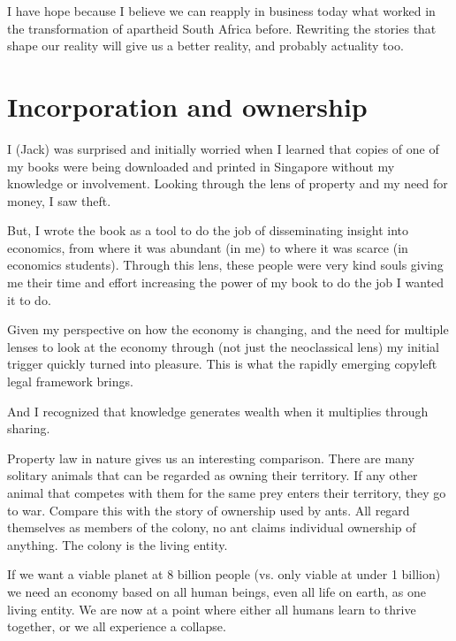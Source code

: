 I have hope because I believe we can reapply in business today what worked in the transformation of apartheid South Africa before. Rewriting the stories that shape our reality will give us a better reality, and probably actuality too.




\section{Incorporation and ownership}
\label{section:slavery}
\begin{longstoryblock}
I (Jack) was surprised and initially worried when I learned that copies of one of my books were being downloaded and printed in Singapore without my knowledge or involvement. Looking through the lens of property and my need for money, I saw theft.


But, I wrote the book as a tool to do the job of disseminating insight into economics, from where it was abundant (in me) to where it was scarce (in economics students). Through this lens, these people were very kind souls giving me their time and effort increasing the power of my book to do the job I wanted it to do.


Given my perspective on how the economy is changing, and the need for multiple lenses to look at the economy through (not just the neoclassical lens) my initial trigger quickly turned into pleasure. This is what the rapidly emerging copyleft legal framework brings.


And I recognized that knowledge generates wealth when it multiplies through sharing.
\end{longstoryblock}


Property law in nature gives us an interesting comparison. There are many solitary animals that can be regarded as owning their territory. If any other animal that competes with them for the same prey enters their territory, they go to war. Compare this with the story of ownership used by ants. All regard themselves as members of the colony, no ant claims individual ownership of anything. The colony is the living entity. 


If we want a viable planet at 8 billion people (vs. only viable at under 1 billion) we need an economy based on all human beings, even all life on earth, as one living entity. We are now at a point where either all humans learn to thrive together, or we all experience a collapse. 


